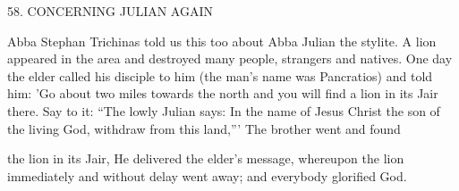58.
CONCERNING JULIAN AGAIN

Abba Stephan Trichinas told us this too about Abba Julian the
stylite.
A lion appeared in the area and destroyed many people,
strangers and natives.
One day the elder called his disciple to him
(the man's name was Pancratios) and told him: 'Go about two miles
towards the north and you will find a lion in its Jair there.
Say to it:
“The lowly Julian says: In the name of Jesus Christ the son of the
living God, withdraw from this land,”' The brother went and found

the lion in its Jair, He delivered the elder's message, whereupon the
lion immediately and without delay went away; and everybody
glorified God.

